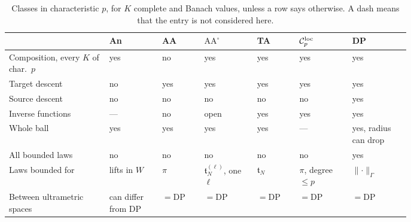 \documentclass[11pt]{amsart}
\theoremstyle{definition}
\theoremstyle{remark}
\numberwithin{equation}{section}
\newcommand{\norm}[1]{\lVert #1\rVert}
\newcommand{\cC}{\mathcal{C}}
\theoremstyle{plain}
\theoremstyle{definition}
\theoremstyle{plain}
\begin{document}
\begin{table}[htbp]
\small
\caption{Classes in characteristic $p$, for $K$ complete and Banach values, unless a row says otherwise. A dash means that the entry is not considered here.}\label{dp:tab:classes}
\begin{tabular}{@{}p{0.19\linewidth}p{0.1\linewidth}p{0.085\linewidth}p{0.105\linewidth}p{0.085\linewidth}p{0.105\linewidth}p{0.11\linewidth}@{}}
 & An & AA & $\mathrm{AA}^\circ$ & TA & $\cC_p^{\rm loc}$ & DP\\
\hline
Composition, every $K$ of char.\ $p$ & yes & no & yes & yes & yes & yes\\
Target descent & no & yes & yes & yes & yes & yes\\
Source descent & no & no & no & no & no & yes\\
Inverse functions & --- & no & open & yes & yes & yes\\
Whole ball & yes & yes & yes & yes & --- & yes, radius can drop\\
All bounded laws & no & no & no & no & no & yes\\
Laws bounded for & lifts in $W$ & $\pi$ & $\mathfrak t^{(\ell)}_N$, one $\ell$ & $\mathfrak t_N$ & $\pi$, degree $\le p$ & $\norm\cdot_\Gamma$\\
Between ultrametric spaces & can differ from DP & $=\mathrm{DP}$ & $=\mathrm{DP}$ & $=\mathrm{DP}$ & $=\mathrm{DP}$ & $=\mathrm{DP}$\\
\end{tabular}
\end{table}
\end{document}
